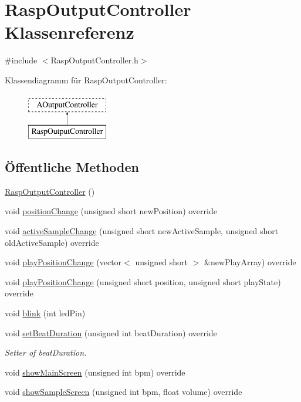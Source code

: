 \hypertarget{class_rasp_output_controller}{}\section{Rasp\+Output\+Controller Klassenreferenz}
\label{class_rasp_output_controller}


{\ttfamily \#include $<$Rasp\+Output\+Controller.\+h$>$}

Klassendiagramm für Rasp\+Output\+Controller\+:\begin{figure}[H]
\begin{center}
\leavevmode
\includegraphics[height=2.000000cm]{class_rasp_output_controller}
\end{center}
\end{figure}
\subsection*{Öffentliche Methoden}
\begin{DoxyCompactItemize}
\item 
\hyperlink{class_rasp_output_controller_afd7487de7ff81c6b092f4072d4fa80a5}{Rasp\+Output\+Controller} ()
\item 
void \hyperlink{class_rasp_output_controller_afce87d510c0564567e4250b22639d5e0}{position\+Change} (unsigned short new\+Position) override
\item 
void \hyperlink{class_rasp_output_controller_a92954cf26d4dd5f7d8835d1d508302c0}{active\+Sample\+Change} (unsigned short new\+Active\+Sample, unsigned short old\+Active\+Sample) override
\item 
void \hyperlink{class_rasp_output_controller_af0304196681872f9c1f6d6f2e2db14a6}{play\+Position\+Change} (vector$<$ unsigned short $>$ \&new\+Play\+Array) override
\item 
void \hyperlink{class_rasp_output_controller_a0778395ee8ec044d04fbfcb2f3b2eb04}{play\+Position\+Change} (unsigned short position, unsigned short play\+State) override
\item 
void \hyperlink{class_rasp_output_controller_a23987d33142c3c09abf8126773f32d99}{blink} (int led\+Pin)
\item 
void \hyperlink{class_rasp_output_controller_a5fd551f1aba056356befd71e5bff23f1}{set\+Beat\+Duration} (unsigned int beat\+Duration) override
\begin{DoxyCompactList}\small\item\em Setter of beat\+Duration. \end{DoxyCompactList}\item 
void \hyperlink{class_rasp_output_controller_ad195a3d664b7c7e5680cd8949203c1fc}{show\+Main\+Screen} (unsigned int bpm) override
\item 
void \hyperlink{class_rasp_output_controller_a613d3a1d1ceb31875be95e4a4b733fba}{show\+Sample\+Screen} (unsigned int bpm, float volume) override
\end{DoxyCompactItemize}
